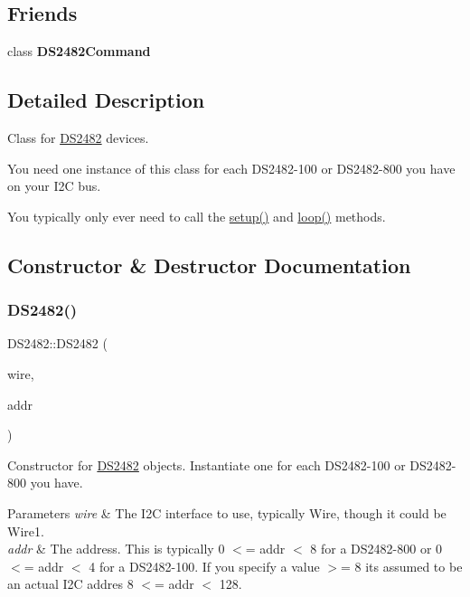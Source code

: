 \subsection*{Friends}
\begin{DoxyCompactItemize}
\item 
\mbox{\label{class_d_s2482_aa76b9fe057be9ac1f4214f3b26c55c37}} 
class {\bfseries D\+S2482\+Command}
\end{DoxyCompactItemize}


\subsection{Detailed Description}
Class for \mbox{\hyperlink{class_d_s2482}{D\+S2482}} devices. 

You need one instance of this class for each D\+S2482-\/100 or D\+S2482-\/800 you have on your I2C bus.

You typically only ever need to call the \mbox{\hyperlink{class_d_s2482_ad99cc97303e8709fd5277f49289f6e6f}{setup()}} and \mbox{\hyperlink{class_d_s2482_a28f5f71ae64c58e71dd8cba3c14a2960}{loop()}} methods. 

\subsection{Constructor \& Destructor Documentation}
\mbox{\label{class_d_s2482_ab048669551660da42318e10fa8457444}} 
\subsubsection{\texorpdfstring{D\+S2482()}{DS2482()}}
{\footnotesize\ttfamily D\+S2482\+::\+D\+S2482 (\begin{DoxyParamCaption}\item[{Two\+Wire \&}]{wire,  }\item[{int}]{addr }\end{DoxyParamCaption})}



Constructor for \mbox{\hyperlink{class_d_s2482}{D\+S2482}} objects. Instantiate one for each D\+S2482-\/100 or D\+S2482-\/800 you have. 


\begin{DoxyParams}{Parameters}
{\em wire} & The I2C interface to use, typically Wire, though it could be Wire1.\\
\hline
{\em addr} & The address. This is typically 0 $<$= addr $<$ 8 for a D\+S2482-\/800 or 0 $<$= addr $<$ 4 for a D\+S2482-\/100. If you specify a value $>$= 8 it\textquotesingle{}s assumed to be an actual I2C addres 8 $<$= addr $<$ 128. \\
\hline
\end{DoxyParams}


